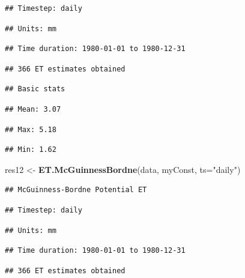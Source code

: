 \documentclass[
]{book}
\newenvironment{Shaded}{\begin{snugshade}}{\end{snugshade}}
\newcommand{\DataTypeTok}[1]{\textcolor[rgb]{0.13,0.29,0.53}{#1}}
\newcommand{\KeywordTok}[1]{\textcolor[rgb]{0.13,0.29,0.53}{\textbf{#1}}}
\newcommand{\NormalTok}[1]{#1}
\newcommand{\StringTok}[1]{\textcolor[rgb]{0.31,0.60,0.02}{#1}}
\begin{document}
\begin{verbatim}
## Timestep: daily
\end{verbatim}

\begin{verbatim}
## Units: mm
\end{verbatim}

\begin{verbatim}
## Time duration: 1980-01-01 to 1980-12-31
\end{verbatim}

\begin{verbatim}
## 366 ET estimates obtained
\end{verbatim}

\begin{verbatim}
## Basic stats
\end{verbatim}

\begin{verbatim}
## Mean: 3.07
\end{verbatim}

\begin{verbatim}
## Max: 5.18
\end{verbatim}

\begin{verbatim}
## Min: 1.62
\end{verbatim}

\begin{Shaded}
\begin{Highlighting}[]
\NormalTok{res12 <-}\StringTok{ }\KeywordTok{ET.McGuinnessBordne}\NormalTok{(data, myConst, }\DataTypeTok{ts=}\StringTok{"daily"}\NormalTok{)}
\end{Highlighting}
\end{Shaded}

\begin{verbatim}
## McGuinness-Bordne Potential ET
\end{verbatim}

\begin{verbatim}
## Timestep: daily
\end{verbatim}

\begin{verbatim}
## Units: mm
\end{verbatim}

\begin{verbatim}
## Time duration: 1980-01-01 to 1980-12-31
\end{verbatim}

\begin{verbatim}
## 366 ET estimates obtained
\end{verbatim}
\end{document}
